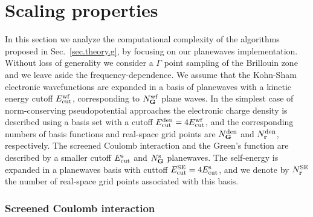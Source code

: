 \documentclass[twocolumn,prb,showpacs,superscriptaddress]{revtex4}
\def\G{{\bf G}}
\def\r{{\bf r}}
\begin{document}
\section{Scaling properties}\label{sec.scaling}

In this section we analyze the computational complexity of the algorithms
proposed in Sec.\ \ref{sec.theory.g}, by focusing on our planewaves
implementation. Without loss of generality we consider a $\Gamma$ point sampling 
of the Brillouin zone and we leave aside the frequency-dependence.
We assume that the Kohn-Sham electronic wavefunctions are expanded in a basis of planewaves
with a kinetic energy cutoff $E_{\rm cut}^{\rm wf}$, corresponding to
$N_\G^{\rm wf}$ plane waves.
In the simplest case of norm-conserving pseudopotential approaches 
the electronic charge density is described using a basis set with a cutoff
$E_{\rm cut}^{\rm den}=4E_{\rm cut}^{\rm wf}$, and the corresponding numbers 
of basis functions and real-space grid points are $N_\G^{\rm den}$ and
$N_\r^{\rm den}$, respectively. The screened Coulomb interaction and the Green's function
are described by a smaller cutoff $E_{\rm cut}^{\rm s}$ and $N_\G^{\rm s}$
planewaves. The self-energy is expanded in a planewaves basis with cuttoff
$E_{\rm cut}^{\rm SE}=4E_{\rm cut}^{\rm s}$, and we denote by $N_\r^{\rm SE}$
the number of real-space grid points associated with this basis.

\subsubsection{Screened Coulomb interaction}\label{sec.coulomb.scaling}
\end{document}
